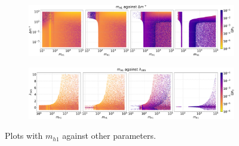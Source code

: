 \documentclass[12pt]{article}
\begin{document}
\begin{figure}[H]
    \begin{subfigure}{\textwidth}
      \centering
      \includegraphics[width=1\columnwidth]{4plot/MD1_DMP.pdf}
    \end{subfigure}

    \begin{subfigure}{\textwidth}
      \centering
      \includegraphics[width=1\columnwidth]{4plot/MD1_l345.pdf}
    \end{subfigure}
\caption{Plots with $m_{h1}$ against other parameters.}
\end{figure}
\end{document}
